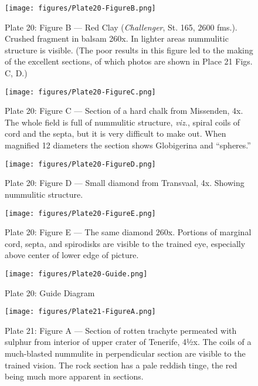 \documentclass[a4paper, 12pt, oneside]{article}
\begin{document}
\clearpage
\begin{figure}[b]
\centering
\texttt{[image: figures/Plate20-FigureB.png]}
\caption{\small Plate 20: Figure B --- Red Clay (\emph{Challenger}, St. 165, 2600 fms.). Crushed fragment in balsam 260x. In lighter areas nummulitic structure is visible. (The poor results in this figure led to the making of the excellent sections, of which photos are shown in Place 21 Figs. C, D.)}
\end{figure}
\clearpage
\begin{figure}[b]
\centering
\texttt{[image: figures/Plate20-FigureC.png]}
\caption{\small Plate 20: Figure C --- Section of a hard chalk from Missenden, 4x. The whole field is full of nummulitic structure, \emph{viz.}, spiral coils of cord and the septa, but it is very difficult to make out. When magnified 12 diameters the section shows Globigerina and ``spheres.''}
\end{figure}
\clearpage
\begin{figure}[b]
\centering
\texttt{[image: figures/Plate20-FigureD.png]}
\caption{\small Plate 20: Figure D --- Small diamond from Transvaal, 4x. Showing nummulitic structure.}
\end{figure}
\clearpage
\begin{figure}[b]
\centering
\texttt{[image: figures/Plate20-FigureE.png]}
\caption{\small Plate 20: Figure E --- The same diamond 260x. Portions of marginal cord, septa, and spirodisks are visible to the trained eye, especially above center of lower edge of picture.}
\end{figure}
\clearpage
\begin{figure}[b]
\centering
\texttt{[image: figures/Plate20-Guide.png]}
\caption{\small Plate 20: Guide Diagram}
\end{figure}
\clearpage
{}
\cfoot{\thepage}
\begin{figure}[H]
\centering
\texttt{[image: figures/Plate21-FigureA.png]}
\caption{\small Plate 21: Figure A --- Section of rotten trachyte permeated with sulphur from interior of upper crater of Tenerife, 4½x. The coils of a much-blasted nummulite in perpendicular section are visible to the trained vision. The rock section has a pale reddish tinge, the red being much more apparent in sections.}
\end{figure}
\end{document}
